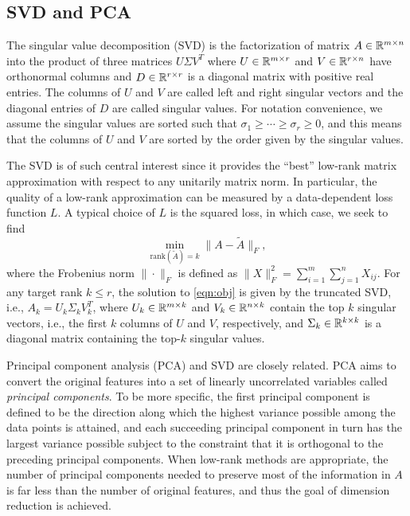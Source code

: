 \subsection{SVD and PCA}

The singular value decomposition (SVD) is the factorization of matrix $A \in \mathbb{R}^{m\times n}$ into the product of three matrices $U\Sigma V^T$ where $U \in \mathbb{R}^{m\times r}$ and $V\in \mathbb{R}^{r\times n}$ have orthonormal columns and $D\in \mathbb{R}^{r\times r}$ is a diagonal matrix with positive real entries. 
The columns of $U$ and $V$ are called left and right singular vectors and the diagonal entries of $D$ are called singular values. 
For notation convenience, we assume the singular values are sorted such that $\sigma_1\geq \cdots \geq \sigma_r\geq 0$, and this means that the columns of $U$ and $V$ are sorted by the order given by the singular values.  

 
The SVD is of such central interest since it provides the ``best'' low-rank matrix approximation with respect to any unitarily matrix norm.
In particular, the quality of  a low-rank approximation can be measured by a data-dependent loss function $L$. 
A typical choice of $L$ is the squared loss, in which case, we seek to find
\begin{equation}
 \label{eqn:obj}
  \min_{\text{rank}(\tilde A) = k} \| A - \tilde A \|_F,
\end{equation}
where the Frobenius norm $\| \cdot \|_F$ is defined as $\|X\|_F^2 = \sum_{i=1}^m \sum_{j=1}^n X_{ij} $.
For any target rank $k\leq r$, the solution to \eqref{eqn:obj} is given by the truncated SVD, i.e., $A_k = U_k \Sigma_k V_k^T$, where $U_k \in \mathbb{R}^{m\times k}$ and $V_k\in \mathbb{R}^{n\times k}$ contain the top $k$ singular vectors, i.e., the first $k$ columns of $U$ and $V$, respectively, and $\Sigma_k\in \mathbb{R}^{k\times k}$ is a diagonal matrix containing the top-$k$ singular values.

Principal component analysis (PCA) and SVD are closely related.
PCA aims to convert the original features into a set of linearly uncorrelated variables called {\it principal components}.
To be more specific, the first principal component is defined to be the direction along which the highest variance possible among the data points is attained, and each succeeding principal component in turn has the largest variance possible subject to the constraint that it is orthogonal to the preceding principal components.
When low-rank methods are appropriate, the number of principal components needed to preserve most of the information in $A$ is far less than the number of original features, and thus the goal of dimension reduction is achieved.

